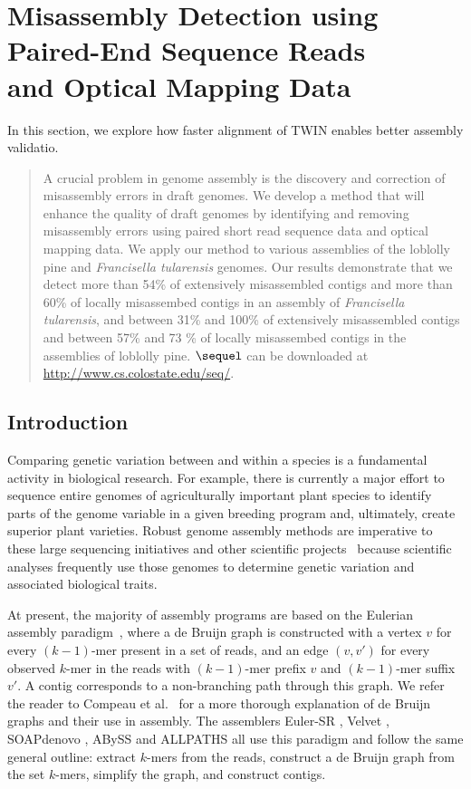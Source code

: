 \documentclass[doctor]{thesis}
\begin{document}
 

\section{Misassembly Detection using Paired-End Sequence Reads \\ and Optical Mapping Data}
In this section, we explore how faster alignment of TWIN enables better assembly validatio.

\makeatletter{}\begin{abstract} 
A crucial problem in genome assembly is the discovery and correction of misassembly errors in draft genomes.  
We develop a method that will enhance the quality of draft genomes by identifying and removing misassembly errors using paired short read sequence data and optical mapping data.  
We apply our method to various assemblies of the loblolly pine and {\em Francisella tularensis} genomes.  
Our results demonstrate that we detect more than 54\% of extensively misassembled contigs and more than 60\% of locally misassembed contigs in an assembly of {\em Francisella tularensis}, and between 31\% and 100\% of extensively misassembled contigs and between 57\% and 73 \% of locally misassembed contigs in the assemblies of loblolly pine.  
$\sequel$ can be downloaded at \url{http://www.cs.colostate.edu/seq/}.
\end{abstract}
 


\makeatletter{}\subsection{Introduction} \label{sec:intro}
Comparing genetic variation between and within a species is a fundamental activity in biological research. For example,  there is currently a major effort to sequence entire genomes of agriculturally important plant species to identify parts of the genome variable in a given breeding program and, ultimately, create superior plant varieties. Robust genome assembly methods are imperative to these large sequencing initiatives and other scientific projects~\cite{haussler2008genome,robinson2011creating,1001_arabidopsis,hmp} because scientific analyses frequently use those genomes to determine genetic variation and associated biological traits. 

At present, the majority of assembly programs are based on the Eulerian assembly paradigm~\cite{IW95,PTW}, where a de Bruijn graph is constructed with a vertex $v$ for every $(k - 1)$-mer present in a set of reads, and an edge $(v, v')$ for every observed $k$-mer in the reads with $(k - 1)$-mer prefix $v$ and $(k - 1)$-mer suffix $v'$. A contig corresponds to a non-branching path through this graph. We refer the reader to Compeau et al.~\cite{compeau} for a more thorough explanation of de Bruijn graphs and their use in assembly.  The assemblers Euler-SR \cite{Chaisson:2008}, Velvet \cite{Zerbino:2008}, SOAPdenovo \cite{soap}, ABySS \cite{Simpson:2009} and ALLPATHS \cite{Butler:2008} all use this paradigm and follow the same general outline: extract $k$-mers from the reads, construct a de Bruijn graph from the set $k$-mers, simplify the graph, and construct contigs.  
\end{document}
